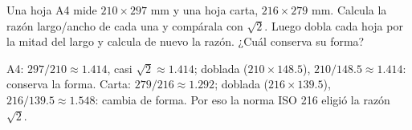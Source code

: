 \documentclass[11pt]{article}
\begin{document}
\begin{preguntas}
\pregunta[1] Una hoja A4 mide $210 \times 297$ mm y una hoja carta, $216 \times 279$ mm.
Calcula la razón largo/ancho de cada una y compárala con $\sqrt{2}$. Luego dobla cada hoja
por la mitad del largo y calcula de nuevo la razón. ¿Cuál conserva su forma?
\begin{solucion}[3.5cm]
A4: $297/210 \approx \num{1,414}$, casi $\sqrt{2} \approx \num{1,414}$; doblada
($210 \times \num{148,5}$), $210/\num{148,5} \approx \num{1,414}$: conserva la forma.
Carta: $279/216 \approx \num{1,292}$; doblada ($216 \times \num{139,5}$),
$216/\num{139,5} \approx \num{1,548}$: cambia de forma. Por eso la norma ISO 216 eligió
la razón $\sqrt{2}$.
\end{solucion}

\end{preguntas}
\end{document}
